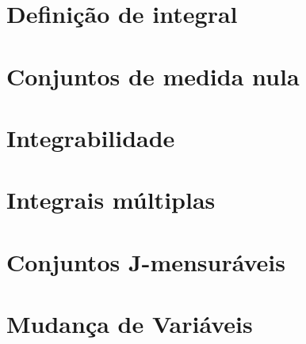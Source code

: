 \section{Definição de integral}

\section{Conjuntos de medida nula}

\section{Integrabilidade}

\section{Integrais múltiplas}

\section{Conjuntos J-mensuráveis}

\section{Mudança de Variáveis}

